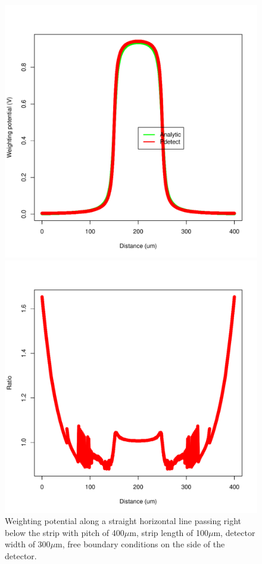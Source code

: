 \documentclass[11pt]{article}
\begin{document}
	\begin{figure}[H]
		\begin{minipage}[b]{.46\linewidth}
			\center
			\includegraphics[scale=0.5]{images/annexe/horizon-top.pdf}
			\caption{Weighting potential along a straight horizontal line passing right below the strip with pitch
					of 400$\mu$m, strip length of 100$\mu$m, detector width of 300$\mu$m, free boundary conditions
					on the side of the detector.}
			\label{fig:horizon}
		\end{minipage} \hfill
		\begin{minipage}[b]{.46\linewidth}
			\center
			\includegraphics[scale=0.5]{images/annexe/horizon-top_ratio.pdf}

\end{minipage}
\end{figure}
\end{document}
